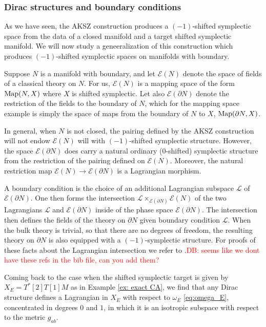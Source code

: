 \documentclass[letterpaper,12pt]{article}
\newcommand{\cE}{\mathcal{E}}
\theoremstyle{definition}
\theoremstyle{remark}
\theoremstyle{examples}
\def\david{\textcolor{red}{DB: }\textcolor{red}}
\begin{document}
\subsubsection{Dirac structures and boundary conditions}

As we have seen, the AKSZ construction produces a $(-1)$-shifted symplectic space from the data of a closed manifold and a target shifted symplectic manifold. 
We will now study a geneeralization of this construction which produces $(-1)$-shifted symplectic spaces on manifolds with boundary. 

Suppose $N$ is a manifold with boundary, and let $\cE(N)$ denote the space of fields of a classical theory on $N$. 
For us, $\cE(N)$ is a mapping space of the form ${\rm Map}(N, X)$ where $X$ is shifted symplectic. 
Let also $\cE(\partial N)$ denote the restriction of the fields to the boundary of $N$, which for the mapping space example is simply the space of maps from the boundary of $N$ to $X$, ${\rm Map}(\partial N, X)$.

In general, when $N$ is not closed, the pairing defined by the AKSZ construction will not endow $\cE(N)$ will with $(-1)$-shifted symplectic structure. 
However, the space $\cE(\partial N)$ does carry a natural ordinary ($0$-shifted) symplectic structure from the restriction of the pairing defined on $\cE(N)$. 
Moreover, the natural restriction map $\cE(N) \to \cE(\partial N)$ is a Lagrangian morphism.

\def\cL{\mathcal{L}}

A boundary condition is the choice of an additional Lagrangian subspace $\cL$ of $\cE(\partial N)$.
One then forms the intersection $\cL \times_{\cE(\partial N)} \cE(N)$ of the two Lagrangians $\cL$ and $\cE(\partial N)$ inside of the phase space $\cE(\partial N)$. 
The intersection then defines the fields of the theory on $\partial N$ given boundary condition $\cL$. 
When the bulk theory is trivial, so that there are no degrees of freedom, the resulting theory on $\partial N$ is also equipped with a $(-1)$-symplectic structure. 
For proofs of these facts about the Lagrangian intersection we refer to \cite{Calaque,PTVV}.\david{seems like we dont have these refs in the bib file, can you add them?}

Coming back to the case when the shifted symplectic target is given by $X_E=T^*[2]T[1]M$ as in Example \ref{ex: exact CA}, we find that any Dirac structure defines a Lagrangian in $X_E$ with respect to $\omega_E$ \eqref{eq:omega_E}, concentrated in degrees $0$ and $1$, in which it is an isotropic subspace with respect to the metric $g_{ab}$.
\end{document}
